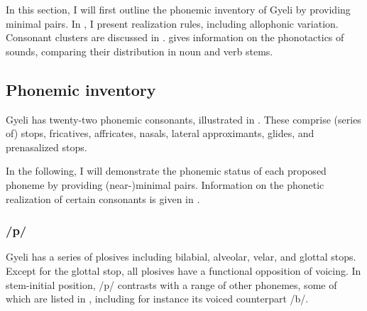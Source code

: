 In this section, I will first outline the phonemic inventory of Gyeli by providing minimal pairs. In , I present realization rules, including allophonic variation.  Consonant clusters are discussed in .  gives information on the phonotactics of sounds, comparing their distribution in noun and verb stems. 

\subsection{Phonemic inventory}
\label{sec:CPhon}

Gyeli has twenty-two phonemic consonants, illustrated in . These comprise (series of) stops, fricatives, affricates,  nasals, lateral approximants, glides, and prenasalized stops.

\begin{table}

\caption{Phonemic inventory}
\label{Tab:Phonemic}
\end{table}

In the following, I will demonstrate the phonemic status of each proposed phoneme by providing (near-)minimal pairs. Information on the phonetic realization of certain consonants is given in .


\subsubsection*{\bfseries /p/} Gyeli has a series of plosives including bilabial, alveolar, velar, and glottal stops. Except for the glottal stop, all plosives have a functional opposition of voicing. In stem-initial position, /p/ contrasts with a range of other phonemes, some of which are listed in , including for instance its voiced counterpart /b/.

